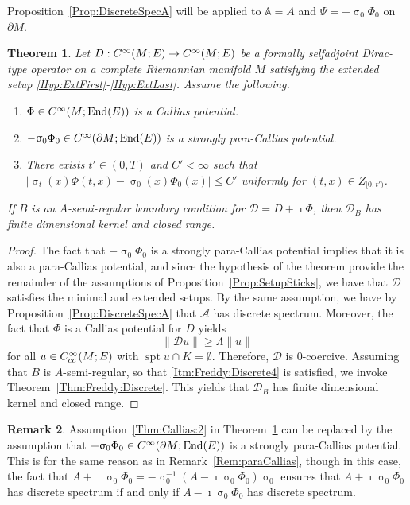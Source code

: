 \documentclass[a4paper,10pt,reqno]{amsart}
\newcommand{\sym}{\upsigma}
\newcommand{\modulus}[1]{|#1|}
\newcommand{\norm}[1]{\| #1 \|}%
\newcommand{\Ck}[2][{}]{{\rm C}^{#2}_{\rm #1}}%
\DeclareMathOperator{\spt}{spt}%
\DeclareMathOperator{\End}{End} %
\newcommand{\DDD}{\mathscr{D}}%
\newcommand{\AAA}{\mathscr{A}}%
\newcommand{\dM}{\partial M}
\newtheorem{theorem}{Theorem}[section]
\theoremstyle{definition}
\newtheorem{remark}[theorem]{Remark}
\begin{document}
Proposition~\ref{Prop:DiscreteSpecA} will be applied to $\mathbb{A}=A$ and $\Psi=-\sym_0 \Phi_0$ on $\dM$.
\begin{theorem}
\label{Thm:Callias}
Let $D: \Ck{\infty}(M;E) \to \Ck{\infty}(M;E)$ be a formally selfadjoint Dirac-type operator on a complete Riemannian manifold $M$ satisfying the  extended setup \ref{Hyp:ExtFirst}-\ref{Hyp:ExtLast}.
Assume the following. 
\begin{enumerate}[label=(\roman*), labelwidth=0pt, labelindent=2pt, leftmargin=21pt]
\item\label{Thm:Callias:1}
$\Phi \in \Ck{\infty}(M;\End(E))$ is a Callias potential.
\item\label{Thm:Callias:2}
$-\sym_0 \Phi_0 \in \Ck{\infty}(\dM;\End(E))$ is a strongly para-Callias potential.
\item\label{Thm:Callias:3}
There exists $t' \in (0,T)$ and $C' < \infty $  such that $\modulus{\sym_t(x) \Phi(t,x) - \sym_0(x)\Phi_0(x)} \leq C'$ uniformly for $(t,x) \in Z_{[0,t')}$.
\end{enumerate} 
If $B$ is an $A$-semi-regular boundary condition for $\DDD = D + \imath \Phi$, then $\DDD_B$ has finite dimensional kernel and closed range. 
\end{theorem}
\begin{proof}
The fact that $-\sym_0 \Phi_0$ is a strongly para-Callias potential implies that it is also a para-Callias potential, and since the hypothesis of the theorem provide the remainder of the assumptions of Proposition~\ref{Prop:SetupSticks}, we have that $\DDD$ satisfies the minimal and extended setups. 
By the same assumption, we have by Proposition~\ref{Prop:DiscreteSpecA} that $\AAA$ has discrete spectrum.
Moreover, the fact that $\Phi$ is a Callias potential for $D$ yields
$$ \norm{\DDD u} \geq \Lambda \norm{u}$$ 
for all $u \in \Ck[cc]{\infty}(M;E)$ with $\spt u \cap K = \emptyset$.
Therefore, $\DDD$ is $0$-coercive.
Assuming that $B$ is $A$-semi-regular,  so that \ref{Itm:Freddy:Discrete4} is satisfied, we invoke Theorem~\ref{Thm:Freddy:Discrete}. 
This yields that $\DDD_B$ has finite dimensional kernel and closed range.
\end{proof}


\begin{remark}
Assumption~\ref{Thm:Callias:2} in Theorem~\ref{Thm:Callias} can be replaced by the assumption that $+\sym_0 \Phi_0 \in \Ck{\infty}(\dM;\End(E))$ is a strongly para-Callias potential.
This is for the same reason as in Remark~\ref{Rem:paraCallias}, though in this case, the fact that $A + \imath \sym_0 \Phi_0 = -\sym_0^{-1}(A - \imath \sym_0 \Phi_0) \sym_0$ ensures that $A + \imath\sym_0 \Phi_0$ has discrete spectrum if and only if $A - \imath\sym_0 \Phi_0$ has discrete spectrum. 
\end{remark}
\end{document}
